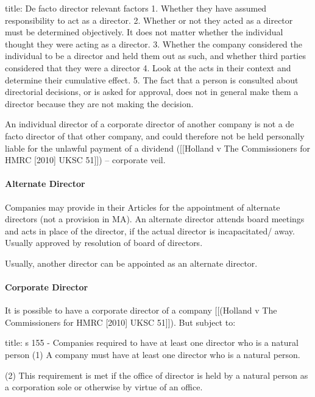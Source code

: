 \documentclass[
]{article}
\newenvironment{Shaded}{}{}
\newcommand{\NormalTok}[1]{#1}
\begin{document}
\begin{Shaded}
\begin{Highlighting}[]
\NormalTok{title: De facto director relevant factors}
\NormalTok{1. Whether they have assumed responsibility to act as a director.}
\NormalTok{2. Whether or not they acted as a director must be determined objectively. It does not matter whether the individual thought they were acting as a director.}
\NormalTok{3. Whether the company considered the individual to be a director and held them out as such, and whether third parties considered that they were a director}
\NormalTok{4. Look at the acts in their context and determine their cumulative effect.}
\NormalTok{5. The fact that a person is consulted about directorial decisions, or is asked for approval, does not in general make them a director because they are not making the decision.}
\end{Highlighting}
\end{Shaded}

An individual director of a corporate director of another company is not
a de facto director of that other company, and could therefore not be
held personally liable for the unlawful payment of a dividend
({[}{[}Holland v The Commissioners for HMRC {[}2010{]} UKSC 51{]}{]}) --
corporate veil.

\hypertarget{alternate-director}{%
\paragraph{Alternate Director}\label{alternate-director}}

Companies may provide in their Articles for the appointment of alternate
directors (not a provision in MA). An alternate director attends board
meetings and acts in place of the director, if the actual director is
incapacitated/ away. Usually approved by resolution of board of
directors.

Usually, another director can be appointed as an alternate director.

\hypertarget{corporate-director}{%
\paragraph{Corporate Director}\label{corporate-director}}

It is possible to have a corporate director of a company {[}{[}(Holland
v The Commissioners for HMRC {[}2010{]} UKSC 51{]}{]}). But subject to:

\begin{Shaded}
\begin{Highlighting}[]
\NormalTok{title: s 155 {-} Companies required to have at least one director who is a natural person}
\NormalTok{(1) A company must have at least one director who is a natural person.}

\NormalTok{(2) This requirement is met if the office of director is held by a natural person as a corporation sole or otherwise by virtue of an office.}
\end{Highlighting}
\end{Shaded}
\end{document}

